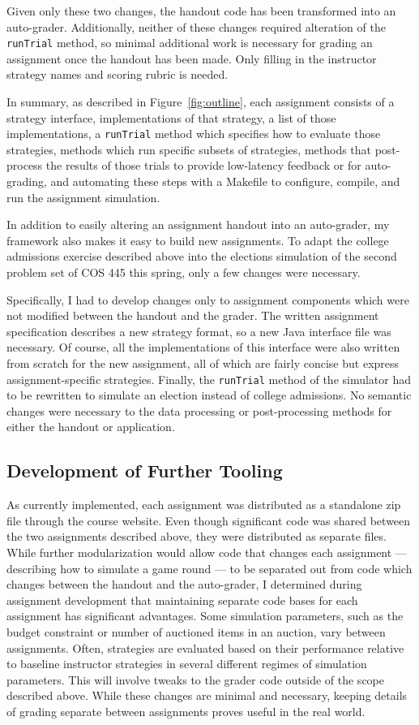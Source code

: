 \documentclass[pageno]{jpaper}
\begin{document}
Given only these two changes, the handout code has been transformed into an auto-grader.
Additionally, neither of these changes required alteration of the \texttt{runTrial} method, so minimal additional work is necessary for grading an assignment once the handout has been made.
Only filling in the instructor strategy names and scoring rubric is needed.

In summary, as described in Figure~\ref{fig:outline}, each assignment consists of a strategy interface, implementations of that strategy, a list of those implementations, a \texttt{runTrial} method which specifies how to evaluate those strategies, methods which run specific subsets of strategies, methods that post-process the results of those trials to provide low-latency feedback or for auto-grading, and automating these steps with a Makefile to configure, compile, and run the assignment simulation.

In addition to easily altering an assignment handout into an auto-grader, my framework also makes it easy to build new assignments.
To adapt the college admissions exercise described above into the elections simulation of the second problem set of COS 445 this spring, only a few changes were necessary.

Specifically, I had to develop changes only to assignment components which were not modified between the handout and the grader.
The written assignment specification describes a new strategy format, so a new Java interface file was necessary.
Of course, all the implementations of this interface were also written from scratch for the new assignment, all of which are fairly concise but express assignment-specific strategies.
Finally, the \texttt{runTrial} method of the simulator had to be rewritten to simulate an election instead of college admissions.
No semantic changes were necessary to the data processing or post-processing methods for either the handout or application.

\subsection*{Development of Further Tooling}
As currently implemented, each assignment was distributed as a standalone zip file through the course website.
Even though significant code was shared between the two assignments described above, they were distributed as separate files.
While further modularization would allow code that changes each assignment --- describing how to simulate a game round --- to be separated out from code which changes between the handout and the auto-grader, I determined during assignment development that maintaining separate code bases for each assignment has significant advantages.
Some simulation parameters, such as the budget constraint or number of auctioned items in an auction, vary between assignments.
Often, strategies are evaluated based on their performance relative to baseline instructor strategies in several different regimes of simulation parameters.
This will involve tweaks to the grader code outside of the scope described above.
While these changes are minimal and necessary, keeping details of grading separate between assignments proves useful in the real world.
\end{document}
